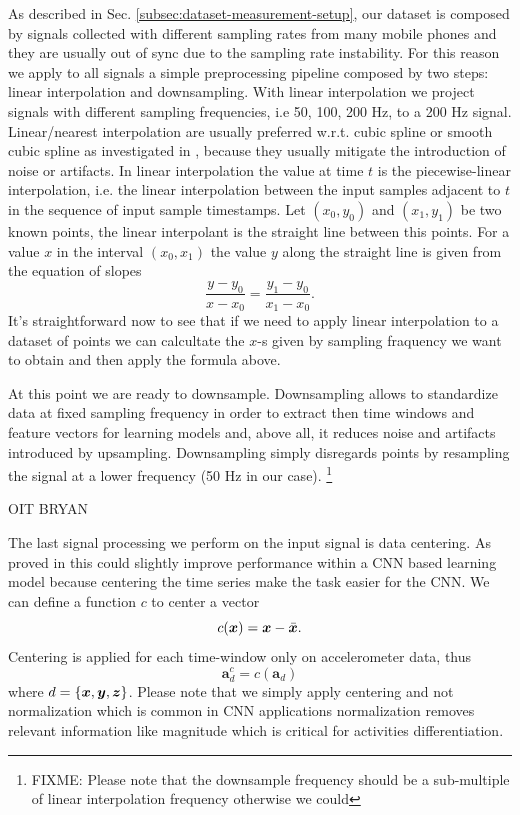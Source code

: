 As described in Sec. \ref{subsec:dataset-measurement-setup}, our
dataset is composed by signals collected with different sampling rates
from many mobile phones and they are usually out of sync due to the
sampling rate instability. For this reason we apply to all signals a
simple preprocessing pipeline composed by two steps: linear
interpolation and downsampling. With linear interpolation we project
signals with different sampling frequencies, i.e 50, 100, 200 Hz, to a
200 Hz signal. Linear/nearest interpolation are usually preferred
w.r.t. cubic spline or smooth cubic spline as investigated in
\cite{stisen2015smart}, because they usually mitigate the introduction
of noise or artifacts. In linear interpolation the value at time $t$
is the piecewise-linear interpolation, i.e. the linear interpolation
between the input samples adjacent to $t$ in the sequence of input
sample timestamps. Let $(x_0, y_0)$ and $(x_1, y_1)$ be two known
points, the linear interpolant is the straight line between this
points. For a value $x$ in the interval $(x_0, x_1)$ the value $y$
along the straight line is given from the equation of slopes
\begin{equation}
  \label{eq:linear-interpolation}
  \frac{y - y_0}{x - x_0} = \frac{y_1 - y_0}{x_1 - x_0}.
\end{equation}
It's straightforward now to see that if we need to apply linear
interpolation to a dataset of points we can calcultate the $x$-s given
by sampling fraquency we want to obtain and then apply the formula
above. 

At this point we are ready to downsample. Downsampling allows to
standardize data at fixed sampling frequency in order to extract then
time windows and feature vectors for learning models and, above all,
it reduces noise and artifacts introduced by upsampling. Downsampling
simply disregards points by resampling the signal at a lower frequency
(50 Hz in our case). \footnote{FIXME: Please note that the downsample
  frequency should be a sub-multiple of linear interpolation frequency
  otherwise we could}

OIT BRYAN

The last signal processing we perform on the input signal is data
centering. As proved in \cite{ignatov2018real} this could slightly
improve performance within a CNN based learning model because
centering the time series make the task easier for the CNN. We can
define a function $c$ to center a vector
\begin{equation}
  \label{eq:centering-func}
  c(\x) = \x - \xm.
\end{equation}
Centering is applied for each time-window only on accelerometer data, thus
\begin{equation}
  \label{eq:centering-accelerometer-data}
  \boldsymbol{a}_{d}^{c} = c(\boldsymbol{a}_{d})
\end{equation}
where $d = \{ \boldsymbol{x}, \boldsymbol{y}, \boldsymbol{z} \}$. Please note that we simply apply
centering and not normalization which is common in CNN applications
normalization removes relevant information like magnitude which is
critical for activities differentiation.

